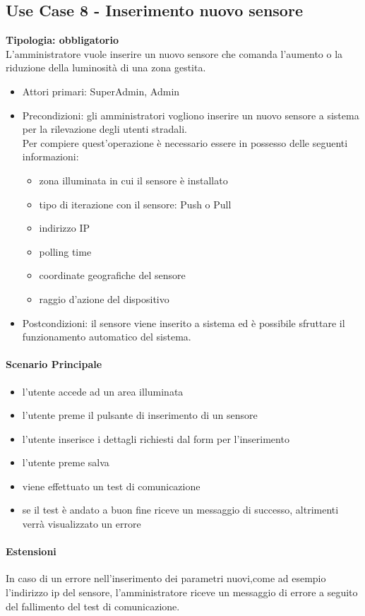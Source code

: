 \documentclass[12pt]{article}
\begin{document}
\subsection{Use Case 8 - Inserimento nuovo sensore}
\textbf{Tipologia: obbligatorio}\\
L'amministratore vuole inserire un nuovo sensore che comanda l'aumento o la riduzione della luminosità di una zona gestita.
\begin{itemize}
	\item Attori primari: SuperAdmin, Admin
	\item Precondizioni: gli amministratori vogliono inserire un nuovo sensore a sistema per la rilevazione degli utenti stradali.\\
	 Per compiere quest'operazione è necessario essere in possesso delle seguenti informazioni: 
	\begin{itemize}
		\item zona illuminata in cui il sensore è installato
		\item tipo di iterazione con il sensore: Push o Pull
		\item indirizzo IP
		\item polling time
		\item coordinate geografiche del sensore
		\item raggio d'azione del dispositivo
	\end{itemize}
	\item Postcondizioni: il sensore viene inserito a sistema ed è possibile sfruttare il funzionamento automatico del sistema.
\end{itemize}
\paragraph{Scenario Principale}
\begin{itemize}
	\item l'utente accede ad un area illuminata
	\item l'utente preme il pulsante di inserimento di un sensore
	\item l'utente inserisce i dettagli richiesti dal form per l'inserimento
	\item l'utente preme salva
	\item viene effettuato un test di comunicazione
	\item se il test è andato a buon fine riceve un messaggio di successo, altrimenti verrà visualizzato un errore
\end{itemize}
\paragraph{Estensioni} In caso di un errore nell'inserimento dei parametri nuovi,come ad esempio l'indirizzo ip del sensore,  l'amministratore riceve un messaggio di errore a seguito del fallimento del test di comunicazione.
\end{document}
